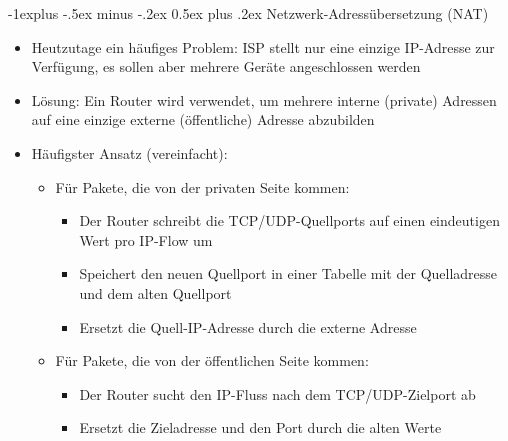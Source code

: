 \documentclass[a4paper]{article}
\makeatletter
\renewcommand{\subsection}{\@startsection{subsection}{2}{0mm}%
 {-1explus -.5ex minus -.2ex}%
 {0.5ex plus .2ex}%
 {\normalfont\normalsize\bfseries}}
\makeatother
\begin{document}
\begin{multicols}{3}
    \subsection{Netzwerk-Adressübersetzung
        (NAT)}

    \begin{itemize}
        \item
              Heutzutage ein häufiges Problem: ISP stellt nur eine einzige
              IP-Adresse zur Verfügung, es sollen aber mehrere Geräte angeschlossen
              werden
        \item
              Lösung: Ein Router wird verwendet, um mehrere interne (private)
              Adressen auf eine einzige externe (öffentliche) Adresse abzubilden
        \item
              Häufigster Ansatz (vereinfacht):

              \begin{itemize}
                  \item
                        Für Pakete, die von der privaten Seite kommen:

                        \begin{itemize}
                            \item
                                  Der Router schreibt die TCP/UDP-Quellports auf einen eindeutigen
                                  Wert pro IP-Flow um
                            \item
                                  Speichert den neuen Quellport in einer Tabelle mit der
                                  Quelladresse und dem alten Quellport
                            \item
                                  Ersetzt die Quell-IP-Adresse durch die externe Adresse
                        \end{itemize}
                  \item
                        Für Pakete, die von der öffentlichen Seite kommen:

                        \begin{itemize}
                            \item
                                  Der Router sucht den IP-Fluss nach dem TCP/UDP-Zielport ab
                            \item
                                  Ersetzt die Zieladresse und den Port durch die alten Werte
                        \end{itemize}
              \end{itemize}
    \end{itemize}



\end{multicols}
\end{document}

